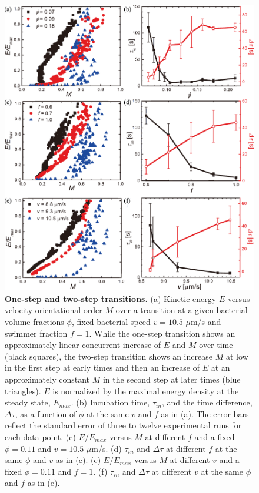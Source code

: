 \begin{figure}[!hp]
	\begin{center}
	\includegraphics[height=5 in]{Figs/4-Emergence/4.pdf}
	\end{center}
	\caption[One-step and Two-step Transitions]
	{
	\textbf{One-step and two-step transitions.}
  (a) Kinetic energy $E$ versus velocity orientational order $M$ over a transition at a given bacterial volume fractions $\phi$, fixed bacterial speed $v = 10.5$ $\mu$m/s and swimmer fraction $f = 1$. While the one-step transition shows an approximately linear concurrent increase of $E$ and $M$ over time (black squares), the two-step transition shows an increase $M$ at low in the first step at early times and then an increase of $E$ at an approximately constant $M$ in the second step at later times (blue triangles). $E$ is normalized by the maximal energy density at the steady state, $E_{max}$.
  (b) Incubation time, $\tau_{in}$, and the time difference, $\Delta\tau$, as a function of $\phi$ at the same $v$ and $f$ as in (a). The error bars reflect the standard error of three to twelve experimental runs for each data point.
  (c) $E/E_{max}$ versus $M$ at different $f$ and a fixed $\phi= 0.11$  and $v = 10.5$ $\mu$m/s.
  (d) $\tau_{in}$ and $\Delta\tau$ at different $f$ at the same $\phi$ and $v$ as in (c).
  (e) $E/E_{max}$ versus $M$ at different $v$ and a fixed $\phi= 0.11$  and $f = 1$.
  (f) $\tau_{in}$ and $\Delta\tau$ at different $v$ at the same $\phi$ and $f$ as in (e).
	}
	\label{fig:4-two-step}
\end{figure}

